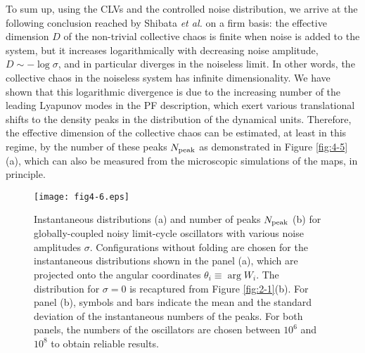 \documentclass[12pt]{iopart}
\begin{document}
To sum up, using the CLVs and the controlled noise distribution,
 we arrive at the following conclusion reached by Shibata \textit{et al.}
 \cite{Shibata.etal-PRL1999} on a firm basis:
 the effective dimension $D$ of the non-trivial collective chaos
 is finite when noise is added to the system,
 but it increases logarithmically with decreasing noise amplitude,
 $D \sim -\log\sigma$, and in particular diverges in the noiseless limit.
In other words, the collective chaos in the noiseless system
 has infinite dimensionality.
We have shown that this logarithmic divergence is
 due to the increasing number of the leading Lyapunov modes
 in the PF description, which exert various translational shifts
 to the density peaks in the distribution of the dynamical units.
Therefore, the effective dimension of the collective chaos
 can be estimated, at least in this regime,
 by the number of these peaks $N_{\rm peak}$
 as demonstrated in Figure \ref{fig:4-5}(a),
 which can also be measured from the microscopic simulations of the maps,
 in principle.

\begin{figure}[t]
 \begin{center}
  \texttt{[image: fig4-6.eps]}
  \caption{Instantaneous distributions (a) and number of peaks $N_{\rm peak}$ (b) for globally-coupled noisy limit-cycle oscillators  with various noise amplitudes $\sigma$. Configurations without folding are chosen for the instantaneous distributions shown in the panel (a), which are projected onto the angular coordinates $\theta_i \equiv \arg W_i$. The distribution for $\sigma = 0$ is recaptured from Figure \ref{fig:2-1}(b). For panel (b), symbols and bars indicate the mean and the standard deviation of the instantaneous numbers of the peaks. For both panels, the numbers of the oscillators are chosen between $10^6$ and $10^8$ to obtain reliable results.}
  \label{fig:4-6}
 \end{center}
\end{figure}%
\end{document}
